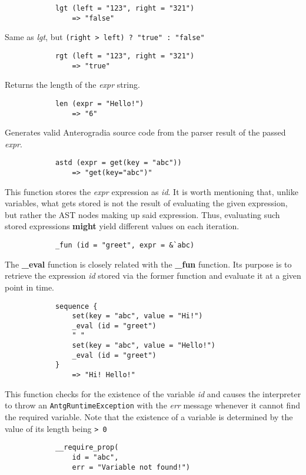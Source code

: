 \begin{multicols}{2}
\begin{verbatim}
			lgt (left = "123", right = "321")
			    => "false"
    \end{verbatim}
    Same as \textit{lgt}, but \verb|(right > left) ? "true" : "false"|
    \begin{verbatim}
			rgt (left = "123", right = "321")
			    => "true"
    \end{verbatim}
    Returns the length of the \textit{expr} string.
    \begin{verbatim}
			len (expr = "Hello!")
			    => "6"
    \end{verbatim}
    \spacing
    Generates valid Anterogradia source code from the parser result of the passed \textit{expr}.
    \begin{verbatim}
			astd (expr = get(key = "abc"))
			    => "get(key="abc")"
    \end{verbatim}
    \spacing
    This function stores the \textit{expr} expression as \textit{id}. It is worth mentioning that, unlike variables,
    what gets stored is not the result of evaluating the given expression, but rather the AST nodes making up said expression.
    Thus, evaluating such stored expressions \textbf{might} yield different values on each iteration.
    \begin{verbatim}
			_fun (id = "greet", expr = &`abc)
    \end{verbatim}
    \spacing
    The \textbf{\_eval} function is closely related with the \textbf{\_fun} function. Its purpose is to retrieve the expression \textit{id} stored via the
    former function and evaluate it at a given point in time.
    \begin{verbatim}
			sequence {
			    set(key = "abc", value = "Hi!")
			    _eval (id = "greet")
			    " "
			    set(key = "abc", value = "Hello!")
			    _eval (id = "greet")
			}
			    => "Hi! Hello!"
    \end{verbatim}
    This function checks for the existence of the variable \textit{id} and causes the interpreter to throw an \verb|AntgRuntimeException|
    with the \textit{err} message whenever it cannot find the required variable. Note that the existence of a variable is determined by the
    value of its length being \verb|> 0|
    \begin{verbatim}
			__require_prop(
			    id = "abc",
			    err = "Variable not found!")


\end{verbatim}
\end{multicols}
